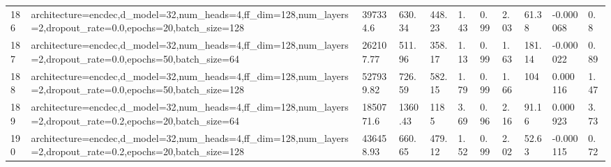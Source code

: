 \begin{longtable}{C{0.8cm} L{2cm} C{1.15cm} C{1.15cm} C{1.15cm} C{1.15cm} C{0.85cm} C{1.25cm} C{1.2cm} C{1.5cm} C{1.0cm}}
186 & architecture=encdec,\newline d\_model=32,\newline num\_heads=4,\newline ff\_dim=128,\newline num\_layers=2,\newline dropout\_rate=0.0,\newline epochs=20,\newline batch\_size=128 & 397334.6 & 630.34 & 448.23 & 1.43 & 0.99 & 2.03 & 61.38 & -0.000068 & 0.8 \\
187 & architecture=encdec,\newline d\_model=32,\newline num\_heads=4,\newline ff\_dim=128,\newline num\_layers=2,\newline dropout\_rate=0.0,\newline epochs=50,\newline batch\_size=64 & 262107.77 & 511.96 & 358.17 & 1.13 & 0.99 & 1.63 & 181.14 & -0.000022 & 0.89 \\
188 & architecture=encdec,\newline d\_model=32,\newline num\_heads=4,\newline ff\_dim=128,\newline num\_layers=2,\newline dropout\_rate=0.0,\newline epochs=50,\newline batch\_size=128 & 527939.82 & 726.59 & 582.15 & 1.79 & 0.99 & 1.66 & 104 & 0.000116 & 1.47 \\
189 & architecture=encdec,\newline d\_model=32,\newline num\_heads=4,\newline ff\_dim=128,\newline num\_layers=2,\newline dropout\_rate=0.2,\newline epochs=20,\newline batch\_size=64 & 1850771.6 & 1360.43 & 1185 & 3.69 & 0.96 & 2.16 & 91.16 & 0.000923 & 3.73 \\
190 & architecture=encdec,\newline d\_model=32,\newline num\_heads=4,\newline ff\_dim=128,\newline num\_layers=2,\newline dropout\_rate=0.2,\newline epochs=20,\newline batch\_size=128 & 436458.93 & 660.65 & 479.12 & 1.52 & 0.99 & 2.02 & 52.63 & -0.000115 & 0.72 \\

\end{longtable}
